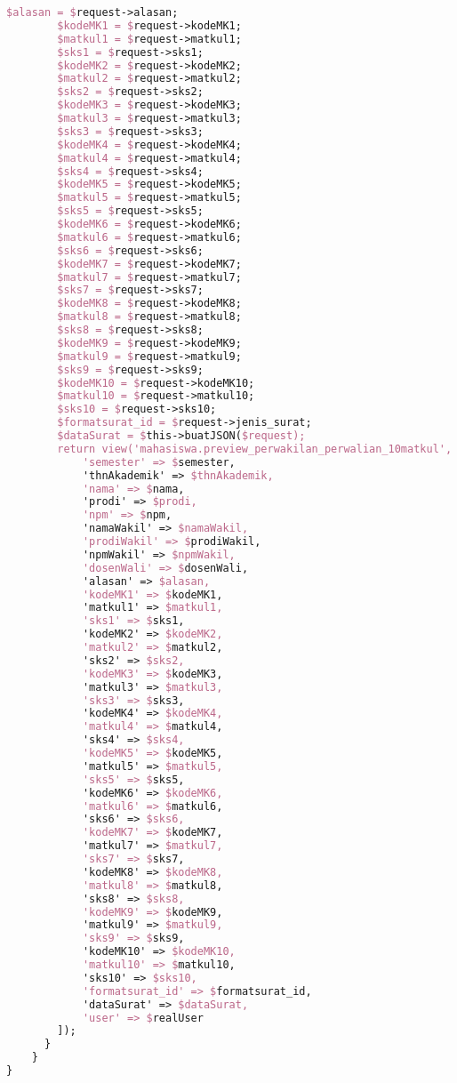 \begin{lstlisting}[language=tex,basicstyle=\tiny,caption=PesanansuratController.php]
        $alasan = $request->alasan;
        $kodeMK1 = $request->kodeMK1;
        $matkul1 = $request->matkul1;
        $sks1 = $request->sks1;
        $kodeMK2 = $request->kodeMK2;
        $matkul2 = $request->matkul2;
        $sks2 = $request->sks2;
        $kodeMK3 = $request->kodeMK3;
        $matkul3 = $request->matkul3;
        $sks3 = $request->sks3;
        $kodeMK4 = $request->kodeMK4;
        $matkul4 = $request->matkul4;
        $sks4 = $request->sks4;
        $kodeMK5 = $request->kodeMK5;
        $matkul5 = $request->matkul5;
        $sks5 = $request->sks5;
        $kodeMK6 = $request->kodeMK6;
        $matkul6 = $request->matkul6;
        $sks6 = $request->sks6;
        $kodeMK7 = $request->kodeMK7;
        $matkul7 = $request->matkul7;
        $sks7 = $request->sks7;
        $kodeMK8 = $request->kodeMK8;
        $matkul8 = $request->matkul8;
        $sks8 = $request->sks8;
        $kodeMK9 = $request->kodeMK9;
        $matkul9 = $request->matkul9;
        $sks9 = $request->sks9;
        $kodeMK10 = $request->kodeMK10;
        $matkul10 = $request->matkul10;
        $sks10 = $request->sks10;
        $formatsurat_id = $request->jenis_surat;
        $dataSurat = $this->buatJSON($request);
        return view('mahasiswa.preview_perwakilan_perwalian_10matkul', [
            'semester' => $semester,
            'thnAkademik' => $thnAkademik,
            'nama' => $nama,
            'prodi' => $prodi,
            'npm' => $npm,
            'namaWakil' => $namaWakil,
            'prodiWakil' => $prodiWakil,
            'npmWakil' => $npmWakil,
            'dosenWali' => $dosenWali,
            'alasan' => $alasan,
            'kodeMK1' => $kodeMK1,
            'matkul1' => $matkul1,
            'sks1' => $sks1,
            'kodeMK2' => $kodeMK2,
            'matkul2' => $matkul2,
            'sks2' => $sks2,
            'kodeMK3' => $kodeMK3,
            'matkul3' => $matkul3,
            'sks3' => $sks3,
            'kodeMK4' => $kodeMK4,
            'matkul4' => $matkul4,
            'sks4' => $sks4,
            'kodeMK5' => $kodeMK5,
            'matkul5' => $matkul5,
            'sks5' => $sks5,
            'kodeMK6' => $kodeMK6,
            'matkul6' => $matkul6,
            'sks6' => $sks6,
            'kodeMK7' => $kodeMK7,
            'matkul7' => $matkul7,
            'sks7' => $sks7,
            'kodeMK8' => $kodeMK8,
            'matkul8' => $matkul8,
            'sks8' => $sks8,
            'kodeMK9' => $kodeMK9,
            'matkul9' => $matkul9,
            'sks9' => $sks9,
            'kodeMK10' => $kodeMK10,
            'matkul10' => $matkul10,
            'sks10' => $sks10,
            'formatsurat_id' => $formatsurat_id,
            'dataSurat' => $dataSurat,
            'user' => $realUser
        ]);
      }
    }
}

\end{lstlisting}

